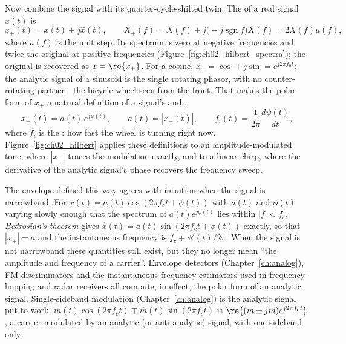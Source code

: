 Now combine the signal with its quarter-cycle-shifted twin. The  of a real
signal $x(t)$ is
\begin{equation}
x_+(t)=x(t)+j\hat{x}(t),\qquad X_+(f)=X(f)+j\big(-j\operatorname{sgn}f\big)X(f)=2X(f)u(f),
\label{eq:ch02:analytic}
\end{equation}
where $u(f)$ is the unit step. Its spectrum is zero at negative frequencies and twice the original
at positive frequencies (Figure~\ref{fig:ch02_hilbert_spectra}); the original is recovered as
$x=\re\{x_+\}$. For a cosine, $x_+=\cos+j\sin=e^{j2\pi f_0t}$: the analytic signal of a sinusoid is
the single rotating phasor, with no counter-rotating partner---the bicycle wheel seen from the front.
That makes the polar form of $x_+$ a natural definition of a signal's  and
,
\begin{equation}
x_+(t)=a(t)\,e^{j\psi(t)},\qquad a(t)=|x_+(t)|,\qquad f_i(t)=\frac{1}{2\pi}\frac{d\psi(t)}{dt},
\label{eq:ch02:envphase}
\end{equation}
where $f_i$ is the : how fast the wheel is turning right now.
Figure~\ref{fig:ch02_hilbert} applies these definitions to an amplitude-modulated tone, where
$|x_+|$ traces the modulation exactly, and to a linear chirp, where the derivative of the analytic
signal's phase recovers the frequency sweep.


The envelope defined this way agrees with intuition when the signal is narrowband. For
$x(t)=a(t)\cos(2\pi f_ct+\phi(t))$ with $a(t)$ and $\phi(t)$ varying slowly enough that the
spectrum of $a(t)e^{j\phi(t)}$ lies within $|f|<f_c$, \emph{Bedrosian's theorem} gives
$\hat x(t)=a(t)\sin(2\pi f_ct+\phi(t))$ exactly, so that $|x_+|=a$ and the instantaneous
frequency is $f_c+\phi'(t)/2\pi$. When the signal is not narrowband these quantities still exist, but
they no longer mean ``the amplitude and frequency of a carrier''. Envelope detectors
(Chapter~\ref{ch:analog}), FM discriminators and the instantaneous-frequency estimators used in
frequency-hopping and radar receivers all compute, in effect, the polar form of an analytic
signal. Single-sideband modulation (Chapter~\ref{ch:analog}) is the analytic signal put to work:
$m(t)\cos(2\pi f_ct)\mp\hat m(t)\sin(2\pi f_ct)$ is $\re\{(m\pm j\hat m)e^{j2\pi f_ct}\}$, a carrier
modulated by an analytic (or anti-analytic) signal, with one sideband only.

